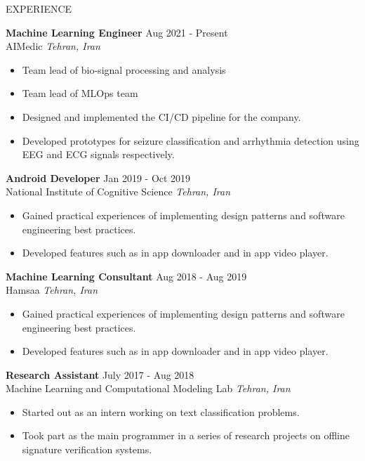 \documentclass{resume} %
\begin{document}
	 \begin{rSection}{EXPERIENCE}
		
		\textbf{Machine Learning Engineer} \hfill Aug 2021 - Present\\
		AIMedic \hfill \textit{Tehran, Iran}
		\begin{itemize}
			\itemsep -3pt {} 
			\item Team lead of bio-signal processing and analysis
			\item Team lead of MLOps team
			\item Designed and implemented the CI/CD pipeline for the company.
			\item Developed prototypes for seizure classification and arrhythmia detection using EEG and ECG signals respectively.
		\end{itemize}
		
		\textbf{Android Developer} \hfill Jan 2019 - Oct 2019\\
		National Institute of Cognitive Science \hfill \textit{Tehran, Iran}
		\begin{itemize}
			\itemsep -3pt {} 
			\item Gained practical experiences of implementing design patterns and software engineering best practices.
			\item Developed features such as in app downloader and in app video player.
		\end{itemize}
		
		\textbf{Machine Learning Consultant} \hfill Aug 2018 - Aug 2019\\
		Hamsaa \hfill \textit{Tehran, Iran}
		\begin{itemize}
			\itemsep -3pt {} 
			\item Gained practical experiences of implementing design patterns and software engineering best practices.
			\item Developed features such as in app downloader and in app video player.
		\end{itemize}
		
		\textbf{Research Assistant} \hfill July 2017 - Aug 2018\\
		Machine Learning and Computational Modeling Lab \hfill \textit{Tehran, Iran}
		\begin{itemize}
			\itemsep -3pt {} 
			\item Started out as an intern working on text classification problems.
			\item Took part as the main programmer in a series of research projects on offline signature verification systems.
		\end{itemize}
		
	\end{rSection} 
	
\end{document}
